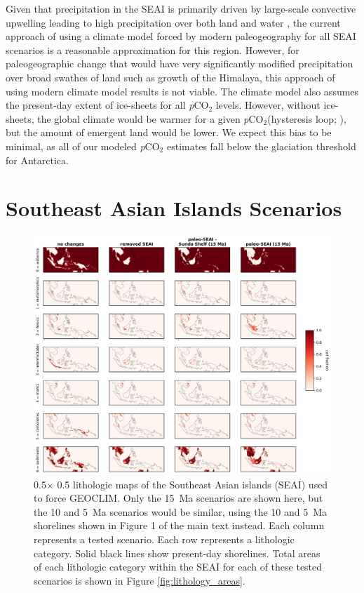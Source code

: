 \documentclass[11pt,letterpaper]{article}
\newcommand{\degrees}{\textdegree\xspace}
\newcommand{\pCOtwo}{\textit{p}CO$_{2}$\xspace}
\begin{document}
Given that precipitation in the SEAI is primarily driven by large-scale convective upwelling leading to high precipitation over both land and water \citep{Donohoe2017a}, the current approach of using a climate model forced by modern paleogeography for all SEAI scenarios is a reasonable approximation for this region. However, for paleogeographic change that would have very significantly modified precipitation over broad swathes of land such as growth of the Himalaya, this approach of using modern climate model results is not viable. The climate model also assumes the present-day extent of ice-sheets for all \pCOtwo levels. However, without ice-sheets, the global climate would be warmer for a given \pCOtwo (hysteresis loop; \citealp{Pollard2005b}), but the amount of emergent land would be lower. We expect this bias to be minimal, as all of our modeled \pCOtwo estimates fall below the glaciation threshold for Antarctica.

\section*{Southeast Asian Islands Scenarios}

\begin{figure}[h!]
    \centering
    \includegraphics[width=1\textwidth]{Figures/SEAI_fracs.jpg}
    \caption{0.5\degrees $\times$ 0.5\degrees lithologic maps of the Southeast Asian islands (SEAI) used to force GEOCLIM. Only the 15~Ma scenarios are shown here, but the 10 and 5~Ma scenarios would be similar, using the 10 and 5~Ma shorelines shown in Figure 1 of the main text instead. Each column represents a tested scenario. Each row represents a lithologic category. Solid black lines show present-day shorelines. Total areas of each lithologic category within the SEAI for each of these tested scenarios is shown in Figure \ref{fig:lithology_areas}.}
    \label{fig:SEAI_fracs}
\end{figure}
\end{document}

